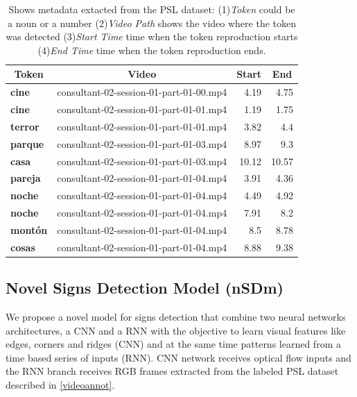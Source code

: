 \documentclass[twocolumn,conference]{article}
\begin{document}
\begin{table}[!htb]
\captionsetup{font=footnotesize}
\centering
\begin{tabular}{ l p{10em} r r }
\toprule
\multicolumn{1}{c}{\textbf{Token}} & 
	\multicolumn{1}{c}{\textbf{Video}} &
	\multicolumn{1}{c}{\textbf{Start}} &
	\multicolumn{1}{c}{\textbf{End}}\\
\midrule
\textbf{cine}&	consultant-02-session-01-part-01-00.mp4&	4.19&	4.75\\
\textbf{cine}&	consultant-02-session-01-part-01-01.mp4&	1.19&	1.75\\
\textbf{terror}&	consultant-02-session-01-part-01-01.mp4&	3.82&	4.4\\
\textbf{parque}&	consultant-02-session-01-part-01-03.mp4&	8.97&	9.3\\
\textbf{casa}&	consultant-02-session-01-part-01-03.mp4&	10.12&	10.57\\
\textbf{pareja}&	consultant-02-session-01-part-01-04.mp4&	3.91&	4.36\\
\textbf{noche}&	consultant-02-session-01-part-01-04.mp4&	4.49&	4.92\\
\textbf{noche}&	consultant-02-session-01-part-01-04.mp4&	7.91&	8.2\\
\textbf{mont\'on}&	consultant-02-session-01-part-01-04.mp4&	8.5&	8.78\\
\textbf{cosas}&	consultant-02-session-01-part-01-04.mp4&	8.88&	9.38\\
\bottomrule
\end{tabular}
\caption{Shows metadata extacted from the PSL dataset: (1)\textit{Token} could be a noun or a number (2)\textit{Video Path} shows the video where the token was detected (3)\textit{Start Time} time when the token reproduction starts (4)\textit{End Time} time when the token reproduction ends.}
\label{tab:token-video-mapping}
\end{table}

\subsection{Novel Signs Detection Model (nSDm)}\label{nsdm}
We propose a novel model for signs detection that combine two neural networks architectures, a CNN and a RNN with the objective to learn visual features like edges, corners and ridges (CNN) and at the same time patterns learned from a time based series of inputs (RNN). CNN network receives optical flow inputs and the RNN branch receives RGB frames extracted from the labeled PSL dataset described in \ref{videoannot}.
\end{document}
